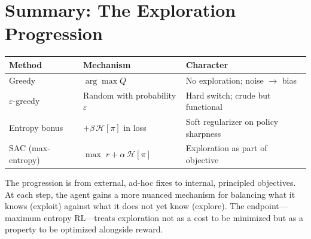 \section{Summary: The Exploration Progression}
\label{sec:exploration-summary}

\begin{center}
\begin{tabular}{@{} l l l @{}}
\toprule
\textbf{Method} & \textbf{Mechanism} & \textbf{Character} \\
\midrule
Greedy & $\arg\max Q$ & No exploration; noise $\to$ bias \\
$\varepsilon$-greedy & Random with probability $\varepsilon$ & Hard switch; crude but functional \\
Entropy bonus & $+\beta\,\mathcal{H}[\pi]$ in loss & Soft regularizer on policy sharpness \\
SAC (max-entropy) & $\max\; r + \alpha\,\mathcal{H}[\pi]$ & Exploration as part of objective \\
\bottomrule
\end{tabular}
\end{center}

The progression is from external, ad-hoc fixes to internal, principled objectives. At each step, the agent gains a more nuanced mechanism for balancing what it knows (exploit) against what it does not yet know (explore). The endpoint---maximum entropy RL---treats exploration not as a cost to be minimized but as a property to be optimized alongside reward.
